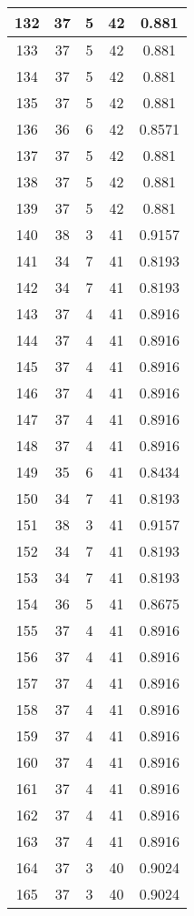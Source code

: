\documentclass[letterpaper, 12pt]{article}
\begin{document}
\begin{longtable}{|c|c|c|c|c|}
\hline
132 & 37 & 5 & 42 & 0.881 \\
\hline
133 & 37 & 5 & 42 & 0.881 \\
\hline
134 & 37 & 5 & 42 & 0.881 \\
\hline
135 & 37 & 5 & 42 & 0.881 \\
\hline
136 & 36 & 6 & 42 & 0.8571 \\
\hline
137 & 37 & 5 & 42 & 0.881 \\
\hline
138 & 37 & 5 & 42 & 0.881 \\
\hline
139 & 37 & 5 & 42 & 0.881 \\
\hline
140 & 38 & 3 & 41 & 0.9157 \\
\hline
141 & 34 & 7 & 41 & 0.8193 \\
\hline
142 & 34 & 7 & 41 & 0.8193 \\
\hline
143 & 37 & 4 & 41 & 0.8916 \\
\hline
144 & 37 & 4 & 41 & 0.8916 \\
\hline
145 & 37 & 4 & 41 & 0.8916 \\
\hline
146 & 37 & 4 & 41 & 0.8916 \\
\hline
147 & 37 & 4 & 41 & 0.8916 \\
\hline
148 & 37 & 4 & 41 & 0.8916 \\
\hline
149 & 35 & 6 & 41 & 0.8434 \\
\hline
150 & 34 & 7 & 41 & 0.8193 \\
\hline
151 & 38 & 3 & 41 & 0.9157 \\
\hline
152 & 34 & 7 & 41 & 0.8193 \\
\hline
153 & 34 & 7 & 41 & 0.8193 \\
\hline
154 & 36 & 5 & 41 & 0.8675 \\
\hline
155 & 37 & 4 & 41 & 0.8916 \\
\hline
156 & 37 & 4 & 41 & 0.8916 \\
\hline
157 & 37 & 4 & 41 & 0.8916 \\
\hline
158 & 37 & 4 & 41 & 0.8916 \\
\hline
159 & 37 & 4 & 41 & 0.8916 \\
\hline
160 & 37 & 4 & 41 & 0.8916 \\
\hline
161 & 37 & 4 & 41 & 0.8916 \\
\hline
162 & 37 & 4 & 41 & 0.8916 \\
\hline
163 & 37 & 4 & 41 & 0.8916 \\
\hline
164 & 37 & 3 & 40 & 0.9024 \\
\hline
165 & 37 & 3 & 40 & 0.9024 \\

\end{longtable}
\end{document}
